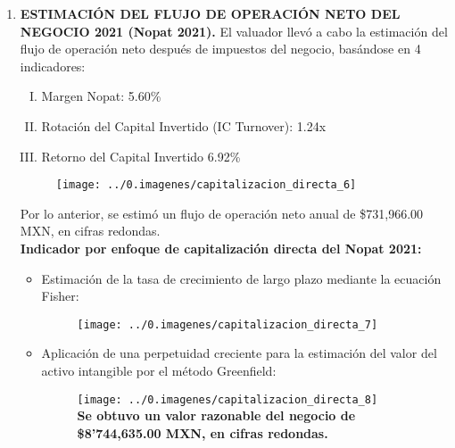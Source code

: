 \begin{enumerate}[1)]
\item \textbf{ESTIMACIÓN DEL FLUJO DE OPERACIÓN NETO DEL NEGOCIO 2021 (Nopat 2021).} El valuador llevó a cabo la estimación del flujo de operación neto después de impuestos del negocio, basándose en 4 indicadores:

\begin{enumerate}[I.]

\item Margen Nopat: 5.60\%
\item Rotación del Capital Invertido (IC Turnover): 1.24x
\item Retorno del Capital Invertido 6.92\%

\end{enumerate}

\begin{figure}[H]
\centering
\texttt{[image: ../0.imagenes/capitalizacion\_directa\_6]}
\end{figure}


Por lo anterior, se estimó un flujo de operación neto anual de \$731,966.00 MXN, en cifras redondas.\\

\textbf{Indicador por enfoque de capitalización directa del Nopat 2021:}\\

\begin{itemize}

\item Estimación de la tasa de crecimiento de largo plazo mediante la ecuación Fisher:

\begin{figure}[H]
\centering
\texttt{[image: ../0.imagenes/capitalizacion\_directa\_7]}
\end{figure}

\item Aplicación de una perpetuidad creciente para la estimación del valor del activo intangible por el método Greenfield:

\begin{figure}[H]
\centering
\texttt{[image: ../0.imagenes/capitalizacion\_directa\_8]}\\
\textbullet\textbf{Se obtuvo un valor razonable del negocio de \$8’744,635.00 MXN, en cifras redondas.}
\end{figure}

\end{itemize}
\end{enumerate}



